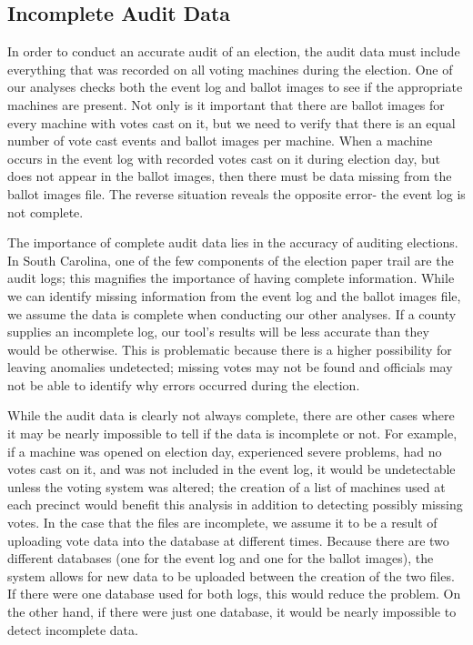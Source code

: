 \subsection{Incomplete Audit Data}
In order to conduct an accurate audit of an election, the audit data must include everything that was recorded on all voting machines during the election.  One of our analyses checks both the event log and ballot images to see if the appropriate machines are present.  Not only is it important that there are ballot images for every machine with votes cast on it, but we need to verify that there is an equal number of vote cast events and ballot images per machine.  When a machine occurs in the event log with recorded votes cast on it during election day, but does not appear in the ballot images, then there must be data missing from the ballot images file.  The reverse situation reveals the opposite error- the event log is not complete.  

The importance of complete audit data lies in the accuracy of auditing elections.  In South Carolina, one of the few components of the election paper trail are the audit logs; this magnifies the importance of having complete information.  While we can identify missing information from the event log and the ballot images file, we assume the data is complete when conducting our other analyses.  If a county supplies an incomplete log, our tool's results will be less accurate than they would be otherwise.  This is problematic because there is a higher possibility for leaving anomalies undetected; missing votes may not be found and officials may not be able to identify why errors occurred during the election.  

While the audit data is clearly not always complete, there are other cases where it may be nearly impossible to tell if the data is incomplete or not.  For example, if a machine was opened on election day, experienced severe problems, had no votes cast on it, and was not included in the event log, it would be undetectable unless the voting system was altered; the creation of a list of machines used at each precinct would benefit this analysis in addition to detecting possibly missing votes.  In the case that the files are incomplete, we assume it to be a result of uploading vote data into the database at different times.  Because there are two different databases (one for the event log and one for the ballot images), the system allows for new data to be uploaded between the creation of the two files.  If there were one database used for both logs, this would reduce the problem.  On the other hand, if there were just one database, it would be nearly impossible to detect incomplete data.  

